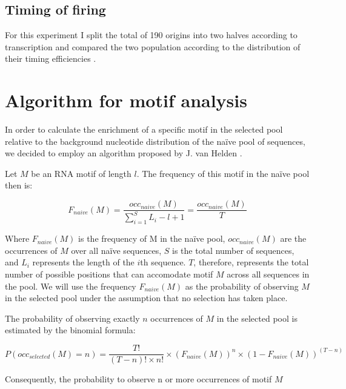 \subsection*{Timing of firing}

For this experiment I split the total of 190 origins into two halves according to transcription and compared the two population according to the distribution of their timing efficiencies .

\section*{Algorithm for motif analysis}

In order to calculate the enrichment of a specific motif in the selected pool relative to the background nucleotide distribution of the na\"{i}ve pool of sequences, we decided to employ an algorithm proposed by J. van Helden \cite{vanhelden:1998:extracting}. 
 
Let $M$ be an RNA motif of length $l$. The frequency of this motif in the na\"{i}ve pool then is:

\begin{equation} \label{feaf}
F_{naive}(M)  =\dfrac{occ_{naive}(M)}{\sum_{i=1}^{S} L_i - l + 1} = \dfrac{occ_{naive}(M)}{T}
\end{equation}

Where $F_{naive}(M)$ is the frequency of M in the na\"{i}ve pool, $occ_{naive}(M)$ are the occurrences of $M$ over all na\"{i}ve sequences, $S$ is the total number of  sequences, and $L_i$ represents the length of the $i$th sequence. $T$, therefore, represents the total number of possible positions that can accomodate motif $M$ across all sequences in the pool. We will use the frequency $F_{naive}(M)$ as the probability of observing $M$ in the selected pool under the assumption that no selection has taken place.


The probability of observing exactly $n$ occurrences of $M$ in the selected pool is estimated by the binomial formula:

\begin{equation}
P(occ_{selected}(M)=n) = \dfrac{T!}{(T-n)! \times n!} \times (F_{naive}(M))^n \times (1-F_{naive}(M))^{(T-n)}
\end{equation}

Consequently, the probability to observe n or more occurrences of motif $M$


